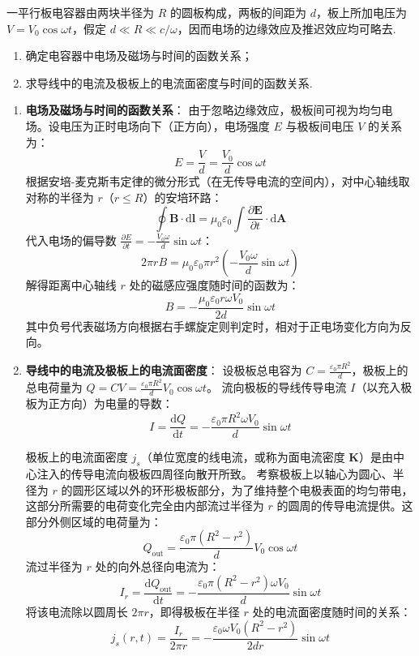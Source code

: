 \begin{exercise}\label{ex:20.3}
一平行板电容器由两块半径为 $R$ 的圆板构成，两板的间距为 $d$，板上所加电压为 $V = V_0 \cos \omega t$，假定 $d \ll R \ll c/\omega$，因而电场的边缘效应及推迟效应均可略去. 
\begin{enumerate}
  \item[(a)] 确定电容器中电场及磁场与时间的函数关系；
  \item[(b)] 求导线中的电流及极板上的电流面密度与时间的函数关系.
\end{enumerate}
\end{exercise}
\begin{solution}
\begin{enumerate}
    \item[(a)] \textbf{电场及磁场与时间的函数关系}：
    由于忽略边缘效应，极板间可视为均匀电场。设电压为正时电场向下（正方向），电场强度 $E$ 与极板间电压 $V$ 的关系为：
    $$ E = \frac{V}{d} = \frac{V_0}{d} \cos \omega t $$
    根据安培-麦克斯韦定律的微分形式（在无传导电流的空间内），对中心轴线取对称的半径为 $r$（$r \le R$）的安培环路：
    $$ \oint \boldsymbol{B} \cdot \mathrm{d}\boldsymbol{l} = \mu_0 \varepsilon_0 \int \frac{\partial \boldsymbol{E}}{\partial t} \cdot \mathrm{d}\boldsymbol{A} $$
    代入电场的偏导数 $\frac{\partial E}{\partial t} = - \frac{V_0 \omega}{d} \sin \omega t$：
    $$ 2\pi r B = \mu_0 \varepsilon_0 \pi r^2 \left( - \frac{V_0 \omega}{d} \sin \omega t \right) $$
    解得距离中心轴线 $r$ 处的磁感应强度随时间的函数为：
    $$ B = - \frac{\mu_0 \varepsilon_0 r \omega V_0}{2d} \sin \omega t $$
    其中负号代表磁场方向根据右手螺旋定则判定时，相对于正电场变化方向为反向。

    \item[(b)] \textbf{导线中的电流及极板上的电流面密度}：
    设极板总电容为 $C = \frac{\varepsilon_0 \pi R^2}{d}$，极板上的总电荷量为 $Q = C V = \frac{\varepsilon_0 \pi R^2}{d} V_0 \cos \omega t$。
    流向极板的导线传导电流 $I$（以充入极板为正方向）为电量的导数：
    $$ I = \frac{\mathrm{d}Q}{\mathrm{d}t} = - \frac{\varepsilon_0 \pi R^2 \omega V_0}{d} \sin \omega t $$
    
    极板上的电流面密度 $j_s$（单位宽度的线电流，或称为面电流密度 $\boldsymbol{K}$）是由中心注入的传导电流向极板四周径向散开所致。
    考察极板上以轴心为圆心、半径为 $r$ 的圆形区域以外的环形极板部分，为了维持整个电极表面的均匀带电，这部分所需要的电荷变化完全由内部流过半径为 $r$ 的圆周的传导电流提供。这部分外侧区域的电荷量为：
    $$ Q_{\text{out}} = \frac{\varepsilon_0 \pi (R^2 - r^2)}{d} V_0 \cos \omega t $$
    流过半径为 $r$ 处的向外总径向电流为：
    $$ I_r = \frac{\mathrm{d}Q_{\text{out}}}{\mathrm{d}t} = - \frac{\varepsilon_0 \pi (R^2 - r^2) \omega V_0}{d} \sin \omega t $$
    将该电流除以圆周长 $2\pi r$，即得极板在半径 $r$ 处的电流面密度随时间的关系：
    $$ j_s(r, t) = \frac{I_r}{2\pi r} = - \frac{\varepsilon_0 \omega V_0 (R^2 - r^2)}{2 d r} \sin \omega t $$
\end{enumerate}
\end{solution}

